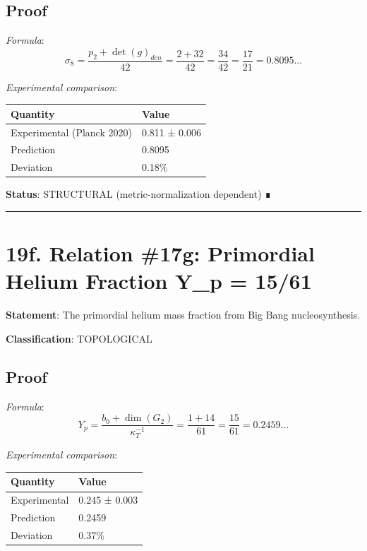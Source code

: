 \documentclass[11pt,a4paper]{article}
\begin{document}
\subsection{Proof}\label{proof-25}

\emph{Formula}: \[\sigma_8 = \frac{p_2 + \det(g)_{den}}{42} = \frac{2 + 32}{42} = \frac{34}{42} = \frac{17}{21} = 0.8095...\]

\emph{Experimental comparison}:

\begin{longtable}[]{@{}ll@{}}
\toprule\noalign{}
Quantity & Value \\
\midrule\noalign{}
\endhead
\bottomrule\noalign{}
\endlastfoot
Experimental (Planck 2020) & 0.811 ± 0.006 \\
Prediction & 0.8095 \\
Deviation & 0.18\% \\
\end{longtable}

\textbf{Status}: STRUCTURAL (metric-normalization dependent) ∎

\begin{center}\rule{\linewidth}{0.5pt}\end{center}

\section{19f. Relation \#17g: Primordial Helium Fraction Y\_\allowbreak{}p = 15/61}\label{f.-relation-17g-primordial-helium-fraction-y_p-1561}

\textbf{Statement}: The primordial helium mass fraction from Big Bang nucleosynthesis.

\textbf{Classification}: TOPOLOGICAL

\subsection{Proof}\label{proof-26}

\emph{Formula}: \[Y_p = \frac{b_0 + \dim(G_2)}{\kappa_T^{-1}} = \frac{1 + 14}{61} = \frac{15}{61} = 0.2459...\]

\emph{Experimental comparison}:

\begin{longtable}[]{@{}ll@{}}
\toprule\noalign{}
Quantity & Value \\
\midrule\noalign{}
\endhead
\bottomrule\noalign{}
\endlastfoot
Experimental & 0.245 ± 0.003 \\
Prediction & 0.2459 \\
Deviation & 0.37\% \\
\end{longtable}
\end{document}
